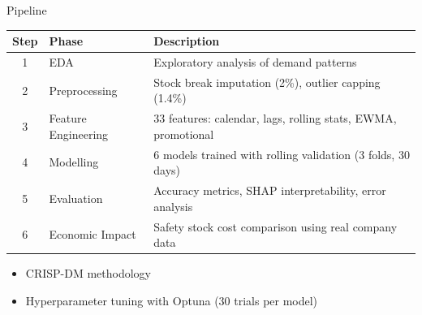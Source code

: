 \documentclass[aspectratio=169]{beamer}
\begin{document}
\begin{frame}{Pipeline}
\begin{table}
\centering
\small
\begin{tabular}{clp{7cm}}
\toprule
\textbf{Step} & \textbf{Phase} & \textbf{Description} \\
\midrule
1 & EDA & Exploratory analysis of demand patterns \\
2 & Preprocessing & Stock break imputation (2\%), outlier capping (1.4\%) \\
3 & Feature Engineering & 33 features: calendar, lags, rolling stats, EWMA, promotional \\
4 & Modelling & 6 models trained with rolling validation (3 folds, 30 days) \\
5 & Evaluation & Accuracy metrics, SHAP interpretability, error analysis \\
6 & Economic Impact & Safety stock cost comparison using real company data \\
\bottomrule
\end{tabular}
\end{table}
\vfill
\begin{itemize}
    \item CRISP-DM methodology
    \item Hyperparameter tuning with Optuna (30 trials per model)
\end{itemize}
\end{frame}
\end{document}
